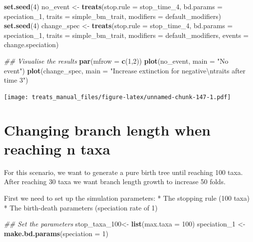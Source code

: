 \documentclass[
]{book}
\newenvironment{Shaded}{\begin{snugshade}}{\end{snugshade}}
\newcommand{\CharTok}[1]{\textcolor[rgb]{0.31,0.60,0.02}{#1}}
\newcommand{\CommentTok}[1]{\textcolor[rgb]{0.56,0.35,0.01}{\textit{#1}}}
\newcommand{\DataTypeTok}[1]{\textcolor[rgb]{0.13,0.29,0.53}{#1}}
\newcommand{\DecValTok}[1]{\textcolor[rgb]{0.00,0.00,0.81}{#1}}
\newcommand{\KeywordTok}[1]{\textcolor[rgb]{0.13,0.29,0.53}{\textbf{#1}}}
\newcommand{\NormalTok}[1]{#1}
\newcommand{\StringTok}[1]{\textcolor[rgb]{0.31,0.60,0.02}{#1}}
\begin{document}
\begin{Shaded}
\begin{Highlighting}[]
\KeywordTok{set.seed}\NormalTok{(}\DecValTok{4}\NormalTok{)}
\NormalTok{no\_event \textless{}{-}}\StringTok{ }\KeywordTok{treats}\NormalTok{(}\DataTypeTok{stop.rule =}\NormalTok{ stop\_time\_}\DecValTok{4}\NormalTok{,}
                 \DataTypeTok{bd.params =}\NormalTok{ speciation\_}\DecValTok{1}\NormalTok{,}
                 \DataTypeTok{traits    =}\NormalTok{ simple\_bm\_trait,}
                 \DataTypeTok{modifiers =}\NormalTok{ default\_modifiers)}
\KeywordTok{set.seed}\NormalTok{(}\DecValTok{4}\NormalTok{)}
\NormalTok{change\_spec \textless{}{-}}\StringTok{ }\KeywordTok{treats}\NormalTok{(}\DataTypeTok{stop.rule =}\NormalTok{ stop\_time\_}\DecValTok{4}\NormalTok{,}
                    \DataTypeTok{bd.params =}\NormalTok{ speciation\_}\DecValTok{1}\NormalTok{,}
                    \DataTypeTok{traits    =}\NormalTok{ simple\_bm\_trait,}
                    \DataTypeTok{modifiers =}\NormalTok{ default\_modifiers,}
                    \DataTypeTok{events    =}\NormalTok{ change.speciation)}

\CommentTok{\#\# Visualise the results}
\KeywordTok{par}\NormalTok{(}\DataTypeTok{mfrow =} \KeywordTok{c}\NormalTok{(}\DecValTok{1}\NormalTok{,}\DecValTok{2}\NormalTok{))}
\KeywordTok{plot}\NormalTok{(no\_event, }\DataTypeTok{main =} \StringTok{"No event"}\NormalTok{)}
\KeywordTok{plot}\NormalTok{(change\_spec, }\DataTypeTok{main =} \StringTok{"Increase extinction for negative}\CharTok{\textbackslash{}n}\StringTok{traits after time 3"}\NormalTok{)}
\end{Highlighting}
\end{Shaded}

\texttt{[image: treats\_manual\_files/figure-latex/unnamed-chunk-147-1.pdf]}

\hypertarget{EG_modify_brlen}{%
\section{Changing branch length when reaching n taxa}\label{EG_modify_brlen}}

For this scenario, we want to generate a pure birth tree until reaching 100 taxa.
After reaching 30 taxa we want branch length growth to increase 50 folds.

First we need to set up the simulation parameters:
* The stopping rule (100 taxa)
* The birth-death parameters (speciation rate of 1)

\begin{Shaded}
\begin{Highlighting}[]
\CommentTok{\#\# Set the parameters}
\NormalTok{stop\_taxa\_}\DecValTok{100}\NormalTok{\textless{}{-}}\StringTok{ }\KeywordTok{list}\NormalTok{(}\DataTypeTok{max.taxa =} \DecValTok{100}\NormalTok{)}
\NormalTok{speciation\_}\DecValTok{1}\NormalTok{ \textless{}{-}}\StringTok{ }\KeywordTok{make.bd.params}\NormalTok{(}\DataTypeTok{speciation =} \DecValTok{1}\NormalTok{)}
\end{Highlighting}
\end{Shaded}
\end{document}
